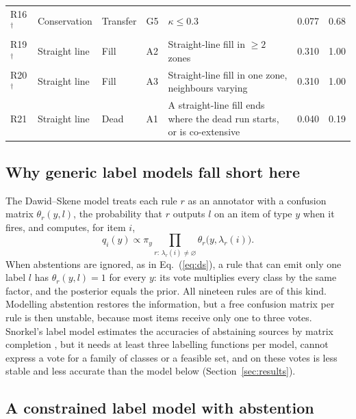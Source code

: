 \begin{table}[htbp]
\begin{tabularx}{\textwidth}{@{}l l l l Y r r@{}}
R16$^{\dagger}$ & Conservation & Transfer & G5 & $\kappa \leq 0.3$ & 0.077 & 0.68 \\
R19$^{\dagger}$ & Straight line & Fill & A2 & Straight-line fill in $\geq 2$ zones & 0.310 & 1.00 \\
R20$^{\dagger}$ & Straight line & Fill & A3 & Straight-line fill in one zone, neighbours varying & 0.310 & 1.00 \\
R21 & Straight line & Dead & A1 & A straight-line fill ends where the dead run starts, or is co-extensive & 0.040 & 0.19 \\
\bottomrule
\end{tabularx}
\end{table}

\subsection{Why generic label models fall short here}\label{sec:dsfail}

The Dawid--Skene model \cite{dawid1979} treats each rule $r$ as an annotator with a confusion matrix $\theta_r(y, l)$, the probability that $r$ outputs $l$ on an item of type $y$ when it fires, and computes, for item $i$,
\begin{equation}
q_i(y) \propto \pi_y \prod_{r:\, \lambda_r(i) \neq \varnothing} \theta_r\big(y, \lambda_r(i)\big).
\label{eq:ds}
\end{equation}
When abstentions are ignored, as in Eq.~(\ref{eq:ds}), a rule that can emit only one label $l$ has $\theta_r(y, l) = 1$ for every $y$: its vote multiplies every class by the same factor, and the posterior equals the prior. All nineteen rules are of this kind. Modelling abstention restores the information, but a free confusion matrix per rule is then unstable, because most items receive only one to three votes. Snorkel's label model estimates the accuracies of abstaining sources by matrix completion \cite{ratner2019metal}, but it needs at least three labelling functions per model, cannot express a vote for a family of classes or a feasible set, and on these votes is less stable and less accurate than the model below (Section~\ref{sec:results}).

\subsection{A constrained label model with abstention}\label{sec:labelmodel}


